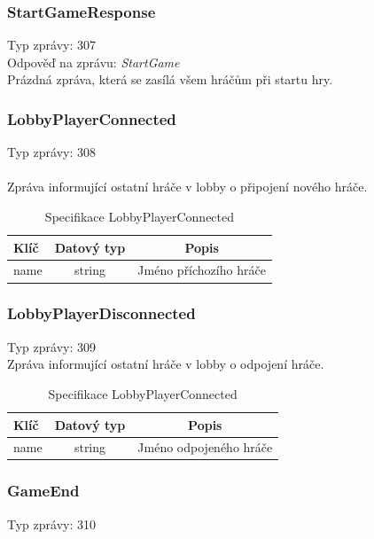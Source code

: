 \documentclass[12pt, a4paper]{article}
\begin{document}
    \subsubsection*{StartGameResponse}
    Typ zprávy: 307\\
    Odpověď na zprávu: \textit{StartGame}\\

    Prázdná zpráva, která se zasílá všem hráčům při startu hry.

    \subsubsection*{LobbyPlayerConnected}
    Typ zprávy: 308\\\\
    Zpráva informující ostatní hráče v lobby o připojení nového hráče.

    \begin{table}[H]
        \centering
        \begin{tabular}{|l|c|c|}
            \hline
            Klíč & Datový typ & Popis\\
            \hline
            \hline
            name & string & Jméno příchozího hráče\\
            \hline
        \end{tabular}
        \caption{Specifikace LobbyPlayerConnected}
    \end{table}

    \subsubsection*{LobbyPlayerDisconnected}
    Typ zprávy: 309\\

    Zpráva informující ostatní hráče v lobby o odpojení hráče.

    \begin{table}[H]
        \centering
        \begin{tabular}{|l|c|c|}
            \hline
            Klíč & Datový typ & Popis\\
            \hline
            \hline
            name & string & Jméno odpojeného hráče\\
            \hline
        \end{tabular}
        \caption{Specifikace LobbyPlayerConnected}
    \end{table}

    \subsubsection*{GameEnd}
    Typ zprávy: 310\\
\end{document}
